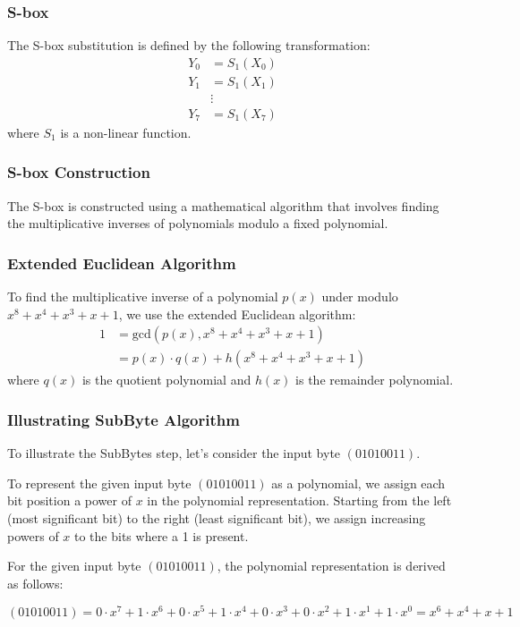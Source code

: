 \documentclass[11pt]{article}
\begin{document}
\subsubsection*{S-box}
The S-box substitution is defined by the following transformation:
\begin{align*}
    Y_0 &= S_1(X_0) \\
    Y_1 &= S_1(X_1) \\
    &\vdots \\
    Y_7 &= S_1(X_7)
\end{align*}
where $S_1$ is a non-linear function.

\subsubsection*{S-box Construction}
The S-box is constructed using a mathematical algorithm that involves finding the multiplicative inverses of polynomials modulo a fixed polynomial.


\subsubsection*{Extended Euclidean Algorithm}
To find the multiplicative inverse of a polynomial $p(x)$ under modulo $x^8 + x^4 + x^3 + x + 1$, we use the extended Euclidean algorithm:
\begin{align*}
    1 &= \text{gcd}(p(x), x^8 + x^4 + x^3 + x + 1) \\
    &= p(x) \cdot q(x) + h(x^8 + x^4 + x^3 + x + 1)
\end{align*}
where $q(x)$ is the quotient polynomial and $h(x)$ is the remainder polynomial.
\subsubsection*{Illustrating SubByte Algorithm}
To illustrate the SubBytes step, let's consider the input byte \( (01010011) \).

To represent the given input byte \( (01010011) \) as a polynomial, we assign each bit position a power of \( x \) in the polynomial representation. Starting from the left (most significant bit) to the right (least significant bit), we assign increasing powers of \( x \) to the bits where a 1 is present.

For the given input byte \( (01010011) \), the polynomial representation is derived as follows:

\[
(01010011) = 0 \cdot x^7 + 1 \cdot x^6 + 0 \cdot x^5 + 1 \cdot x^4 + 0 \cdot x^3 + 0 \cdot x^2 + 1 \cdot x^1 + 1 \cdot x^0 = x^6 + x^4 + x + 1
\]
\end{document}

